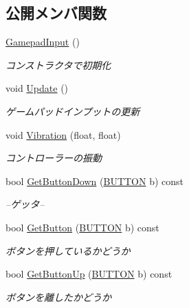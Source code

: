 \subsection*{公開メンバ関数}
\begin{DoxyCompactItemize}
\item 
\mbox{\hyperlink{class_gamepad_input_acd9878326e438f379020827d63ebd6cf}{Gamepad\+Input}} ()
\begin{DoxyCompactList}\small\item\em コンストラクタで初期化 \end{DoxyCompactList}\item 
void \mbox{\hyperlink{class_gamepad_input_a3512c0cc4d57534c83db09c4b5377caa}{Update}} ()
\begin{DoxyCompactList}\small\item\em ゲームパッドインプットの更新 \end{DoxyCompactList}\item 
void \mbox{\hyperlink{class_gamepad_input_ac78cf60cd63a1b1d53510dd7193b5fcb}{Vibration}} (float, float)
\begin{DoxyCompactList}\small\item\em コントローラーの振動 \end{DoxyCompactList}\item 
bool \mbox{\hyperlink{class_gamepad_input_a209f58f3b488e87d5feb99c7b2f06939}{Get\+Button\+Down}} (\mbox{\hyperlink{gamepad__input_8h_a739845b0076428add52ca3cec492e705}{B\+U\+T\+T\+ON}} b) const
\begin{DoxyCompactList}\small\item\em --ゲッタ-- \end{DoxyCompactList}\item 
bool \mbox{\hyperlink{class_gamepad_input_a73a45e377ebcd58b6f0462d6d8fbcb94}{Get\+Button}} (\mbox{\hyperlink{gamepad__input_8h_a739845b0076428add52ca3cec492e705}{B\+U\+T\+T\+ON}} b) const
\begin{DoxyCompactList}\small\item\em ボタンを押しているかどうか \end{DoxyCompactList}\item 
bool \mbox{\hyperlink{class_gamepad_input_ac33f84af8806aeaff44296de9bf1dde0}{Get\+Button\+Up}} (\mbox{\hyperlink{gamepad__input_8h_a739845b0076428add52ca3cec492e705}{B\+U\+T\+T\+ON}} b) const
\begin{DoxyCompactList}\small\item\em ボタンを離したかどうか \end{DoxyCompactList}\item 

\end{DoxyCompactItemize}
